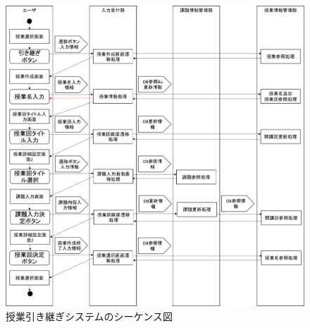 \begin{figure}[htbp]
  \begin{center}
    \includegraphics[width=1\linewidth,clip]{./img/takeover_lecture/main.png}
    \caption{授業引き継ぎシステムのシーケンス図}\label{fig:takeoverlectureseaquence}
  \end{center}
\end{figure}

